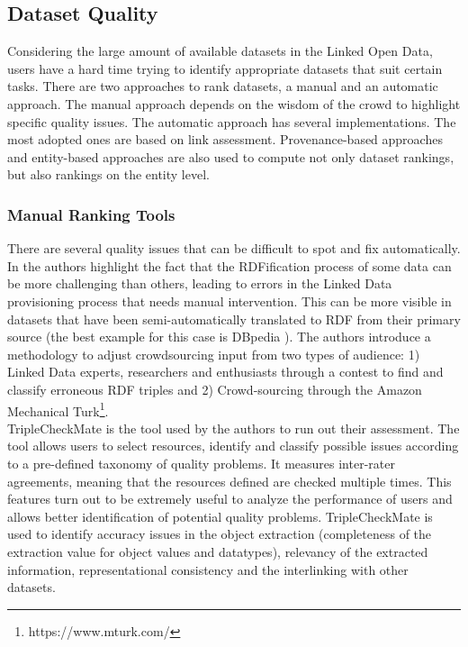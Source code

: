 \documentclass[onecolumn, crcready]{iosart2c}
\begin{document}
\subsection {Dataset Quality}
Considering the large amount of available datasets in the Linked Open Data, users have a hard time trying to identify appropriate datasets that suit certain tasks. There are two approaches to rank datasets, a manual and an automatic approach. The manual approach depends on the wisdom of the crowd to highlight specific quality issues. The automatic approach has several implementations. The most adopted ones are based on link assessment. Provenance-based approaches and entity-based approaches are also used to compute not only dataset rankings, but also rankings on the entity level.\\


\subsubsection {Manual Ranking Tools}

There are several quality issues that can be difficult to spot and fix automatically. In \cite{Acosta2013} the authors highlight the fact that the RDFification process of some data can be more challenging than others, leading to errors in the Linked Data provisioning process that needs manual intervention. This can be more visible in datasets that have been semi-automatically translated to RDF from their primary source (the best example for this case is DBpedia \cite{bizer_dbpedia_2009}). The authors introduce a methodology to adjust crowdsourcing input from two types of audience: 1) Linked Data experts, researchers and enthusiasts through a contest to find and classify erroneous RDF triples and 2) Crowd-sourcing through the Amazon Mechanical Turk\footnote{https://www.mturk.com/}.\\ TripleCheckMate \cite{Kontokostas2013} is the tool used by the authors to run out their assessment. The tool allows users to select resources, identify and classify possible issues according to a pre-defined taxonomy of quality problems. It measures inter-rater agreements, meaning that the resources defined are checked multiple times. This features turn out to be extremely useful to analyze the performance of users and allows better identification of potential quality problems. TripleCheckMate is used to identify accuracy issues in the object extraction (completeness of the extraction value for object values and datatypes), relevancy of the extracted information, representational consistency and the interlinking with other datasets.\\
\end{document}
